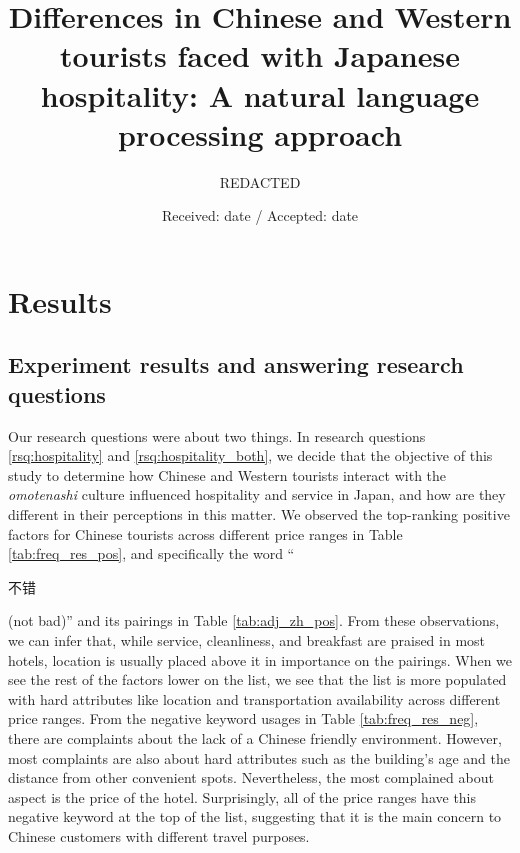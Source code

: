\documentclass[smallextended,natbib]{svjour3}       %
\begin{document}
\title{Differences in Chinese and Western tourists faced with Japanese hospitality: A natural language processing approach}

        \author{REDACTED}



        \date{Received: date / Accepted: date}

        \maketitle

\section{Results}\label{results}

  \subsection{Experiment results and answering research questions}

    Our research questions were about two things. In research questions \ref{rsq:hospitality} and \ref{rsq:hospitality_both}, we decide that the objective of this study to determine how Chinese and Western tourists interact with the \textit{omotenashi} culture influenced hospitality and service in Japan, and how are they different in their perceptions in this matter. We observed the top-ranking positive factors for Chinese tourists across different price ranges in Table \ref{tab:freq_res_pos}, and specifically the word ``\begin{CJK}{UTF8}{gbsn}不错\end{CJK} (not bad)'' and its pairings in Table \ref{tab:adj_zh_pos}. From these observations, we can infer that, while service, cleanliness, and breakfast are praised in most hotels, location is usually placed above it in importance on the pairings. When we see the rest of the factors lower on the list, we see that the list is more populated with hard attributes like location and transportation availability across different price ranges. From the negative keyword usages in Table \ref{tab:freq_res_neg}, there are complaints about the lack of a Chinese friendly environment. However, most complaints are also about hard attributes such as the building's age and the distance from other convenient spots. Nevertheless, the most complained about aspect is the price of the hotel. Surprisingly, all of the price ranges have this negative keyword at the top of the list, suggesting that it is the main concern to Chinese customers with different travel purposes.
\end{document}
